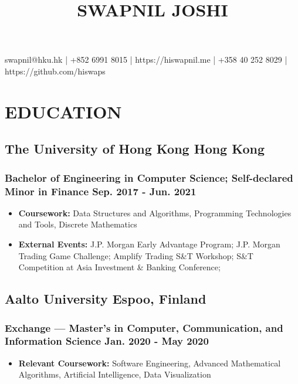 \documentclass{article}
\makeatletter
\renewcommand{\maketitle}{

\begin{center}
{\huge\bfseries
\thetitle}

\vspace*{0.35cm}

swapnil@hku.hk | +852 6991 8015 | https://hiswapnil.me | +358 40 252 8029 | https://github.com/hiswaps

\end{center}
}
\makeatother
\begin{document}
\title{SWAPNIL JOSHI}
\maketitle
\thispagestyle{empty} 





\section{EDUCATION}
\vspace{-1.5mm}
\subsection{The University of Hong Kong \hspace{4.12in} Hong Kong}
\subsubsection{Bachelor of Engineering in Computer Science; Self-declared Minor in Finance \hspace{1.29in} Sep. 2017 - Jun. 2021}
\vspace{-2.9mm}
\begin{itemize}[noitemsep]
\item \textbf{Coursework:} Data Structures and Algorithms, Programming Technologies and Tools, Discrete Mathematics 
\item  \textbf{External Events:} J.P. Morgan Early Advantage Program; J.P. Morgan Trading Game Challenge; Amplify Trading S\&T Workshop; S\&T Competition at Asia Investment \& Banking Conference; 

\end{itemize}

\vspace{-1.6mm}

\subsection{Aalto University \hspace{4.8in} Espoo, Finland}
\subsubsection{Exchange — Master’s in Computer, Communication, and Information Science \hspace{1.29in} Jan. 2020 - May 2020}
\vspace{-2.9mm}
\begin{itemize}[noitemsep]
\item \textbf{Relevant Coursework:} Software Engineering, Advanced Mathematical Algorithms, Artificial Intelligence, Data Visualization
\end{itemize}
\end{document}
